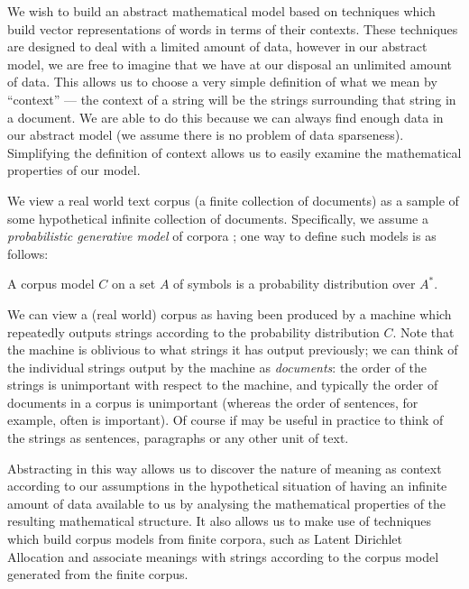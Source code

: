 We wish to build an abstract mathematical model based on techniques which build vector representations of words in terms of their contexts. These techniques are designed to deal with a limited amount of data, however in our abstract model, we are free to imagine that we have at our disposal an unlimited amount of data. This allows us to choose a very simple definition of what we mean by ``context'' --- the context of a string will be the strings surrounding that string in a document. We are able to do this because we can always find enough data in our abstract model (we assume there is no problem of data sparseness). Simplifying the definition of context allows us to easily examine the mathematical properties of our model.

We view a real world text corpus (a finite collection of documents) as a sample of some hypothetical infinite collection of documents. 
 Specifically, we assume a \emph{probabilistic generative model} of corpora \citep{Blei:03}; one way to define such models is as follows:
\begin{defn}[Corpus Model]
A corpus model $C$ on a set $A$ of symbols is a probability distribution over $A^*$.
\end{defn} %

We can view a (real world) corpus as having been produced by a machine which repeatedly outputs strings according to the probability distribution $C$. Note that the machine is oblivious to what strings it has output previously; we can think of the individual strings output by the machine as \emph{documents}: the order of the strings is unimportant with respect to the machine, and typically the order of documents in a corpus is unimportant (whereas the order of sentences, for example, often is important). Of course if may be useful in practice to think of the strings as sentences, paragraphs or any other unit of text.

Abstracting in this way allows us to discover the nature of meaning as context according to our assumptions in the hypothetical situation of having an infinite amount of data available to us by analysing the mathematical properties of the resulting mathematical structure. It also allows us to make use of techniques which build corpus models from finite corpora, such as Latent Dirichlet Allocation and associate meanings with strings according to the corpus model generated from the finite corpus.

